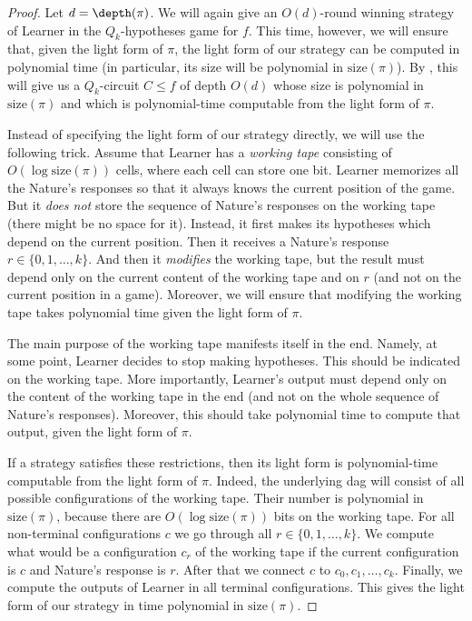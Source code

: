 \begin{proof}
Let $d = \depth(\pi)$.
We will again give an $O(d)$-round winning strategy of Learner in the $Q_k$-hypotheses game for $f$. This time, however, we will ensure that, given the light form of $\pi$, the light form of our strategy can be computed in polynomial time (in particular, its size will be polynomial in $\mathrm{size}(\pi)$). By , this will give us
%
a $Q_k$-circuit $C\le f$
of depth $O(d)$  %
whose size is polynomial in $\mathrm{size}(\pi)$ and which is polynomial-time computable from the light form of $\pi$.

Instead of specifying the light form of our strategy directly, we will use the following trick. Assume that Learner has a \emph{working tape} consisting of $O(\log \mathrm{size}(\pi))$ cells, where each cell can store one bit. Learner memorizes all the Nature's responses so that it %
 always knows the current position of the game. 
 But it %
 \emph{does not} store the sequence of Nature's responses on the working tape (there might be no space for it). 
Instead, it %
 first makes its %
hypotheses which depend on the current position. 
Then it %
 receives a Nature's response $r\in \{0, 1, \ldots, k\}$. 
And then it %
 \emph{modifies} the working tape, but the result must depend only on the current content of the working tape and on $r$ (and not on the current position in a game). 
Moreover, we will ensure that modifying the working tape takes  polynomial time given the light form of $\pi$.  

The main purpose of the working tape manifests itself in the end. Namely, at some point, Learner decides to stop making hypotheses. This should be indicated on the working tape. More importantly, Learner's output must depend only on the content of the working tape in the end (and not on the whole sequence of Nature's responses). Moreover, this should take polynomial time to compute that output, given the light form of $\pi$. 

If a strategy satisfies these restrictions, then its light form is polynomial-time computable from the light form of $\pi$. Indeed, the underlying dag will consist of all possible configurations of the working tape. Their number is polynomial in $\mathrm{size}(\pi)$, because there are $O(\log \mathrm{size}(\pi))$ bits on the working tape. For all non-terminal configurations $c$ we go through all $r\in\{0, 1, \ldots, k\}$. We compute what would be a configuration $c_r$ of the working tape if the current configuration is $c$ and Nature's response is $r$. After that we connect $c$ to $c_0, c_1, \ldots, c_k$. Finally, we compute the outputs of Learner in all terminal configurations. This gives the light form of our strategy in time polynomial in $\mathrm{size}(\pi)$.


\end{proof}

